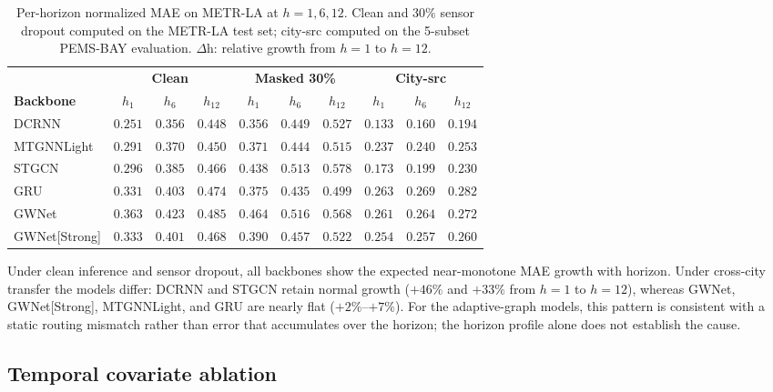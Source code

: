 \begin{table}[h]
\centering
\caption{Per-horizon normalized MAE on METR-LA at $h{=}1, 6, 12$.
Clean and 30\% sensor dropout computed on the METR-LA test set;
city-src computed on the 5-subset PEMS-BAY evaluation.
$\Delta$h: relative growth from $h{=}1$ to $h{=}12$.}
\label{tab:horizon}
\vskip 0.1in
\scriptsize
\setlength{\tabcolsep}{4pt}
\begin{tabular}{lccc|ccc|ccc}
\toprule
 & \multicolumn{3}{c}{\textbf{Clean}} & \multicolumn{3}{c}{\textbf{Masked 30\%}} & \multicolumn{3}{c}{\textbf{City-src}} \\
\cmidrule(lr){2-4}\cmidrule(lr){5-7}\cmidrule(lr){8-10}
\textbf{Backbone} & $h_1$ & $h_6$ & $h_{12}$ & $h_1$ & $h_6$ & $h_{12}$ & $h_1$ & $h_6$ & $h_{12}$ \\
\midrule
DCRNN         & $0.251$ & $0.356$ & $0.448$ & $0.356$ & $0.449$ & $0.527$ & $0.133$ & $0.160$ & $0.194$ \\
MTGNNLight    & $0.291$ & $0.370$ & $0.450$ & $0.371$ & $0.444$ & $0.515$ & $0.237$ & $0.240$ & $0.253$ \\
STGCN         & $0.296$ & $0.385$ & $0.466$ & $0.438$ & $0.513$ & $0.578$ & $0.173$ & $0.199$ & $0.230$ \\
GRU           & $0.331$ & $0.403$ & $0.474$ & $0.375$ & $0.435$ & $0.499$ & $0.263$ & $0.269$ & $0.282$ \\
GWNet         & $0.363$ & $0.423$ & $0.485$ & $0.464$ & $0.516$ & $0.568$ & $0.261$ & $0.264$ & $0.272$ \\
GWNet[Strong] & $0.333$ & $0.401$ & $0.468$ & $0.390$ & $0.457$ & $0.522$ & $0.254$ & $0.257$ & $0.260$ \\
\bottomrule
\end{tabular}
\end{table}

Under clean inference and sensor dropout, all backbones show the expected near-monotone
MAE growth with horizon. Under cross-city transfer the models differ:
DCRNN and STGCN retain normal growth ($+46\%$ and $+33\%$ from $h{=}1$ to $h{=}12$),
whereas GWNet, GWNet[Strong], MTGNNLight, and GRU are nearly flat ($+2\%$--$+7\%$).
For the adaptive-graph models, this pattern is consistent with a static
routing mismatch rather than error that accumulates over the horizon; the
horizon profile alone does not establish the cause.

\subsection{Temporal covariate ablation}
\label{sec:appendix_temporal_cov}


